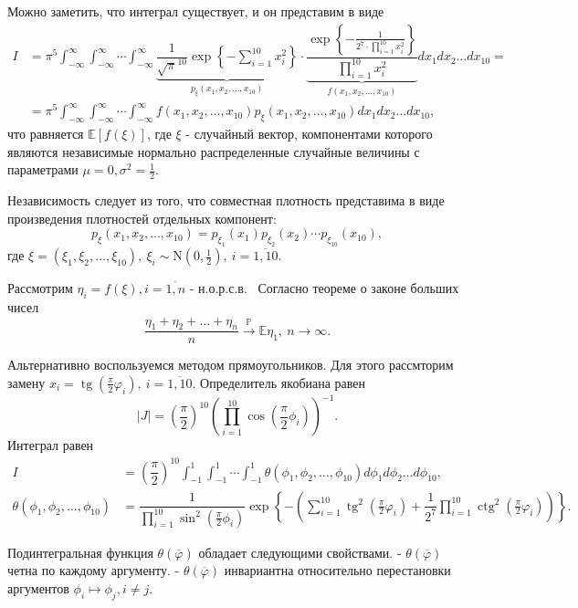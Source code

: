 \documentclass[11pt]{report}
\begin{document}
Можно заметить, что интеграл существует, и он представим в виде
$$
\begin{aligned}
I &= \pi^5\int_{-\infty}^{\infty}\int_{-\infty}^{\infty}\cdots\int_{-\infty}^{\infty}
\underbrace{\dfrac{1}{\sqrt{\pi}^{10}}\exp\left\{ -\sum_{i=1}^{10}x_i^2 \right\}}_{p_{\xi}(x_1,x_2,\dots,x_{10})} \cdot 
\underbrace{\dfrac{\exp\left\{- \frac{1}{2^7\cdot\prod_{i=1}^{10}x_i^2} \right\}}{\prod_{i=1}^{10}x_i^2}}_{f(x_1,x_2,\dots,x_{10})}
dx_1dx_2\dots dx_{10} = \\
&= \pi^5\int_{-\infty}^{\infty}\int_{-\infty}^{\infty}\cdots\int_{-\infty}^{\infty}f(x_1,x_2,\dots,x_{10})p_{\xi}(x_1,x_2,\dots,x_{10})
dx_1dx_2\dots dx_{10},
\end{aligned}
$$
что равняется $\mathbb{E}[f(\xi)]$, где $\xi$ - случайный вектор, компонентами которого являются независимые нормально распределенные случайные величины с параметрами $\mu=0, \sigma^2=\frac{1}{2}$.

Независимость следует из того, что совместная плотность представима в виде произведения плотностей отдельных компонент:
$$
p_{\xi}(x_1,x_2,\dots,x_{10}) = p_{\xi_1}(x_1)p_{\xi_2}(x_2)\cdots p_{\xi_{10}}(x_{10}),
$$
где $\xi=(\xi_1,\xi_2,\dots,\xi_{10}),~ \xi_i\sim\mathrm{N}(0,\frac{1}{2}),~ i=\overline{1,10}$.

Рассмотрим $\eta_i=f(\xi),i=\overline{1,n}$ - н.о.р.с.в. \
Согласно теореме о законе больших чисел
$$
\dfrac{\eta_1 + \eta_2 + \dots + \eta_n}{n} \stackrel{\mathbb{P}}{\longrightarrow} \mathbb{E}\eta_1,~ n\to\infty.
$$

Альтернативно воспользуемся методом прямоугольников. Для этого рассмторим замену $x_i = \operatorname{tg}(\frac{\pi}{2}\varphi_i),~i=\overline{1,10}$. Определитель якобиана равен
$$
|J| = \left( \dfrac{\pi}{2} \right)^{10} \left(\prod^{10}_{i=1}\cos\left(\frac{\pi}{2}\phi_i\right)\right)^{-1}.
$$
Интеграл равен
$$
\begin{aligned}
I &= \left( \dfrac{\pi}{2} \right)^{10}\int_{-1}^1\int_{-1}^{1}\cdots\int_{-1}^1 \theta(\phi_1,\phi_2,\dots,\phi_{10})d\phi_1d\phi_2\dots d\phi_{10}, \\
\theta(\phi_1,\phi_2,\dots,\phi_{10}) &= \dfrac{1}{\prod^{10}_{i=1}\sin^2\left(\frac{\pi}{2}\phi_i\right)}
\exp\left\{ -\left( \sum_{i=1}^{10}\operatorname{tg}^2\left(\frac{\pi}{2}\varphi_i\right) + \dfrac{1}{2^7}\prod^{10}_{i=1}\operatorname{ctg}^2\left(\frac{\pi}{2}\varphi_i\right) \right) \right\}.
\end{aligned}
$$

Подинтегральная функция $\theta(\overline\varphi)$ обладает следующими свойствами.
- $\theta(\overline\varphi)$ четна по каждому аргументу.
- $\theta(\overline\varphi)$ инвариантна относительно перестановки аргументов $\phi_i\mapsto\phi_j,i\neq j$.
\end{document}
